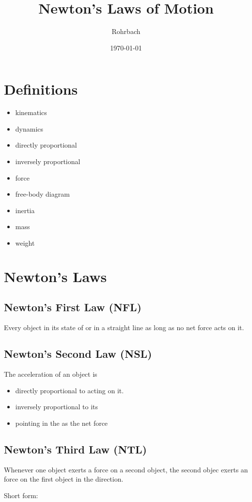 \documentclass[10pt]{exam}
\title{Newton's Laws of Motion}
\author{Rohrbach}
\date{\today}
\begin{document}
\maketitle

\section*{Definitions}

\begin{itemize}
  \item kinematics
  \item dynamics
  \item directly proportional
  \item inversely proportional
  \item force
  \item free-body diagram
  \item inertia
  \item mass
  \item weight
\end{itemize}


\section*{Newton's Laws}

\subsection*{Newton's First Law (NFL)}

Every object \fillin[continues][7em] in its state of \fillin[continues][5em] or  in a straight line as long as no net force acts on it.

\vspace{1em}


\subsection*{Newton's Second Law (NSL)}

The acceleration of an object is
%
\begin{itemize}
  \item directly proportional to  acting on it.
  \item inversely proportional to its \fillin[mass][5em]
  \item pointing in the  as the net force
\end{itemize}

\vspace{5em}


\subsection*{Newton's Third Law (NTL)}

Whenever one object exerts a force on a second object, the second objec exerts an \fillin[equal][7em] force on the first object in the \fillin[opposite][7em] direction.

\vspace{5em}

\noindent
Short form: 
\end{document}
